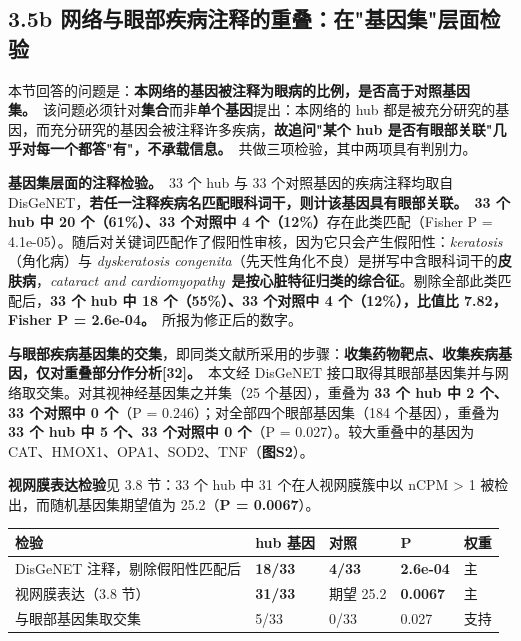 \documentclass[UTF8,fontset=windows,11pt]{ctexart}
\begin{document}
\subsection{3.5b 网络与眼部疾病注释的重叠：在"基因集"层面检验}

本节回答的问题是：\textbf{本网络的基因被注释为眼病的比例，是否高于对照基因集。}\ 该问题必须针对\textbf{集合}而非\textbf{单个基因}提出：本网络的 hub 都是被充分研究的基因，而充分研究的基因会被注释许多疾病，\textbf{故追问"某个 hub 是否有眼部关联"几乎对每一个都答"有"，不承载信息。}\ 共做三项检验，其中两项具有判别力。

\textbf{基因集层面的注释检验。}\ 33 个 hub 与 33 个对照基因的疾病注释均取自 DisGeNET，\textbf{若任一注释疾病名匹配眼科词干，则计该基因具有眼部关联。}\ \textbf{33 个 hub 中 20 个（61\%）、33 个对照中 4 个（12\%）}存在此类匹配（Fisher P = 4.1e-05）。随后对关键词匹配作了假阳性审核，因为它只会产生假阳性：\textit{keratosis}（角化病）与 \textit{dyskeratosis congenita}（先天性角化不良）是拼写中含眼科词干的\textbf{皮肤病}，\textit{cataract and cardiomyopathy}\ \textbf{是按心脏特征归类的综合征}。剔除全部此类匹配后，\textbf{33 个 hub 中 18 个（55\%）、33 个对照中 4 个（12\%），比值比 7.82，Fisher P = 2.6e-04。}\ 所报为修正后的数字。

\textbf{与眼部疾病基因集的交集}，即同类文献所采用的步骤：\textbf{收集药物靶点、收集疾病基因，仅对重叠部分作分析[32]。}\ 本文经 DisGeNET 接口取得其眼部基因集并与网络取交集。对其视神经基因集之并集（25 个基因），重叠为 \textbf{33 个 hub 中 2 个、33 个对照中 0 个}（P = 0.246）；对全部四个眼部基因集（184 个基因），重叠为 \textbf{33 个 hub 中 5 个、33 个对照中 0 个}（P = 0.027）。较大重叠中的基因为 CAT、HMOX1、OPA1、SOD2、TNF（\textbf{图S2}）。

\textbf{视网膜表达检验}见 3.8 节：33 个 hub 中 31 个在人视网膜簇中以 nCPM > 1 被检出，而随机基因集期望值为 25.2（\textbf{P = 0.0067}）。

\begin{center}
\small
\begin{longtable}{p{}p{}p{}p{}p{}}
\hline
检验 & hub 基因 & 对照 & P & 权重 \\
\hline
DisGeNET 注释，剔除假阳性匹配后 & \textbf{18/33} & \textbf{4/33} & \textbf{2.6e-04} & 主 \\
视网膜表达（3.8 节） & \textbf{31/33} & 期望 25.2 & \textbf{0.0067} & 主 \\
与眼部基因集取交集 & 5/33 & 0/33 & 0.027 & 支持 \\
\hline
\end{longtable}
\end{center}
\end{document}
